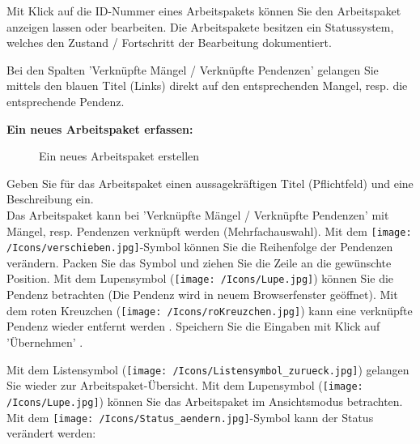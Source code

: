 \vspace{\baselineskip}

Mit Klick auf die ID-Nummer eines Arbeitspakets können Sie den Arbeitspaket anzeigen lassen oder bearbeiten. Die Arbeitspakete besitzen ein Statussystem, welches den Zustand / Fortschritt der Bearbeitung dokumentiert.

\vspace{\baselineskip}

Bei den Spalten 'Verknüpfte Mängel / Verknüpfte Pendenzen' gelangen Sie mittels den blauen Titel (Links) direkt auf den entsprechenden Mangel, resp. die entsprechende Pendenz.

\pagebreak
\textbf{Ein neues Arbeitspaket erfassen:}

\begin{figure}[H]
\caption{Ein neues Arbeitspaket erstellen}
\end{figure}

Geben Sie für das Arbeitspaket einen aussagekräftigen Titel (Pflichtfeld) und eine Beschreibung ein.\\
Das Arbeitspaket kann bei 'Verknüpfte Mängel / Verknüpfte Pendenzen' mit Mängel, resp. Pendenzen verknüpft werden (Mehrfachauswahl). Mit dem \texttt{[image: /Icons/verschieben.jpg]}-Symbol  können Sie die Reihenfolge der Pendenzen verändern. Packen Sie das Symbol und ziehen Sie die Zeile an die gewünschte Position. Mit dem Lupensymbol (\texttt{[image: /Icons/Lupe.jpg]})  können Sie die Pendenz betrachten (Die Pendenz wird in neuem Browserfenster geöffnet). Mit dem roten Kreuzchen (\texttt{[image: /Icons/roKreuzchen.jpg]}) kann eine verknüpfte Pendenz wieder entfernt werden . Speichern Sie die Eingaben mit Klick auf 'Übernehmen' .

\vspace{\baselineskip}

Mit dem Listensymbol (\texttt{[image: /Icons/Listensymbol\_zurueck.jpg]})  gelangen Sie wieder zur Arbeitspaket-Übersicht. Mit dem Lupensymbol (\texttt{[image: /Icons/Lupe.jpg]})  können Sie das Arbeitspaket im Ansichtsmodus betrachten. Mit dem \texttt{[image: /Icons/Status\_aendern.jpg]}-Symbol  kann der Status verändert werden:


